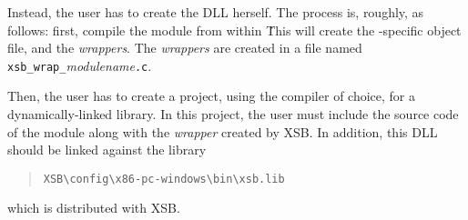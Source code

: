 Instead, the user has to create the DLL herself.  The process is, roughly,
as follows: first, compile the module from within \ourprolog\.
This will create the \ourprolog-specific object file, and the
\emph{wrappers}. The \emph{wrappers} are created in a file named
\texttt{xsb\_wrap\_}\emph{modulename}\texttt{.c}.

Then, the user has to create a project, using the compiler of choice, for a
dynamically-linked library. In this project, the user must include the
source code of the module along with the \emph{wrapper} created by XSB. In
addition, this DLL should be linked against the library
\begin{quote}
   \verb|XSB\config\x86-pc-windows\bin\xsb.lib|
\end{quote}
which is distributed with
XSB.



